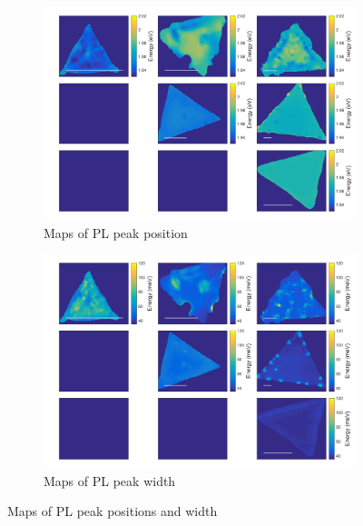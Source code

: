 \begin{figure}[h]
	\begin{center}
		\begin{subfigure}[b]{0.4\textwidth}
			\includegraphics[width=\textwidth]{PaperSIMapsPositionPL.png}
			\caption{Maps of PL peak position}
			\label{fig:PaperSIMapsPositionPL}
		\end{subfigure}
		\quad
		\begin{subfigure}[b]{0.4\textwidth}
			\includegraphics[width=\textwidth]{PaperSIMapsWidthPL.png}
			\caption{Maps of PL peak width}
			\label{fig:PaperSIMapsWidthPL}
		\end{subfigure}
		\caption{Maps of PL peak positions and width}
		\label{fig:PaperSIMapsPL}
	\end{center}
\end{figure}

